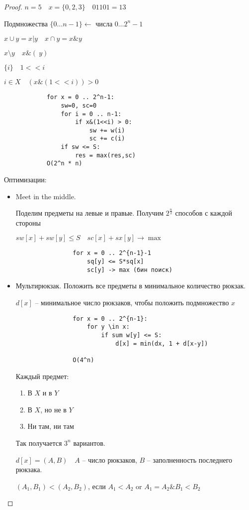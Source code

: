 \documentclass{book}
\theoremstyle{definition}
\begin{document}
\begin{proof}
        $n=5\quad x = \{0,2,3\}\quad 01101 = 13$ 

        Подмножества $\{0\ldots n-1\} \leftarrow$ числа $0\ldots 2^n-1$

        $x\cup y = x|y\quad x\cap y = x \& y$

        $x \setminus y\quad x\&\left( ~y \right) $

        $\{i\}\quad 1<<i$

        $i\in X\quad (x\&(1<<i))>0$
        \begin{verbatim}
            for x = 0 .. 2^n-1:
                sw=0, sc=0
                for i = 0 .. n-1:
                    if x&(1<<i) > 0:
                        sw += w(i)
                        sc += c(i)
                if sw <= S:
                    res = max(res,sc)
            O(2^n * n)
        \end{verbatim}

    Оптимизации:
    \begin{itemize}
        \item Meet in the middle.

            Поделим предметы на левые и правые. Получим $2^{\frac{n}{2}}$ способов с каждой стороны

            $sw[x] + sw[y] \leqslant S\quad sc[x]+sx[y] \to \max$

            \begin{verbatim}
                for x = 0 .. 2^{n-1}-1
                    sq[y] <= S*sq[x]
                    sc[y] -> max (бин поиск)
            \end{verbatim}  
        \item Мультирюкзак. Положить все предметы в минимальное количество рюкзак. 

            $d[x]$ -- минимальное число рюкзаков, чтобы положить подмножество  $x$ 

            \begin{verbatim}
                for x = 0 .. 2^{n-1}:
                    for y \in x:
                        if sum w[y] <= S:
                            d[x] = min(dx, 1 + d[x-y])

                O(4^n)
            \end{verbatim}

            Каждый предмет:
            \begin{enumerate}
                \item В $X$ и в  $Y$
                \item В  $X$, но не в  $Y$
                \item Ни там, ни там
            \end{enumerate}

            Так получается $3^n$ вариантов.

            $d[x] = (A,B)\quad A$ -- число рюкзаков,  $B$ -- заполненность последнего рюкзака.

            $(A_1,B_1)<(A_2,B_2)$, если $A_1<A_2 $ or $A_1=A_2\& B_1<B_2$
    \end{itemize}
\end{proof}
\end{document}
